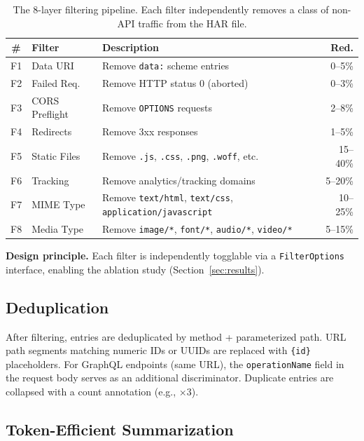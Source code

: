 \documentclass[10pt,twocolumn]{article}
\begin{document}
\begin{table}[t]
\centering
\caption{The 8-layer filtering pipeline. Each filter independently removes a class of non-API traffic from the HAR file.}
\label{tab:filters}
\scriptsize
\begin{tabularx}{\columnwidth}{@{}c l X r@{}}
\toprule
\textbf{\#} & \textbf{Filter} & \textbf{Description} & \textbf{Red.} \\
\midrule
F1 & Data URI       & Remove \texttt{data:} scheme entries              & 0--5\%  \\
F2 & Failed Req.    & Remove HTTP status 0 (aborted)                    & 0--3\%  \\
F3 & CORS Preflight & Remove \texttt{OPTIONS} requests                  & 2--8\%  \\
F4 & Redirects      & Remove 3xx responses                              & 1--5\%  \\
F5 & Static Files   & Remove \texttt{.js}, \texttt{.css}, \texttt{.png}, \texttt{.woff}, etc. & 15--40\% \\
F6 & Tracking       & Remove analytics/tracking domains                 & 5--20\% \\
F7 & MIME Type      & Remove \texttt{text/html}, \texttt{text/css}, \texttt{application/javascript} & 10--25\% \\
F8 & Media Type     & Remove \texttt{image/*}, \texttt{font/*}, \texttt{audio/*}, \texttt{video/*} & 5--15\% \\
\bottomrule
\end{tabularx}
\end{table}

\textbf{Design principle.} Each filter is independently togglable via a \texttt{FilterOptions} interface, enabling the ablation study (Section~\ref{sec:results}).

\subsection{Deduplication}

After filtering, entries are deduplicated by method + parameterized path. URL path segments matching numeric IDs or UUIDs are replaced with \texttt{\{id\}} placeholders. For GraphQL endpoints (same URL), the \texttt{operationName} field in the request body serves as an additional discriminator. Duplicate entries are collapsed with a count annotation (e.g., $\times 3$).

\subsection{Token-Efficient Summarization}
\end{document}
